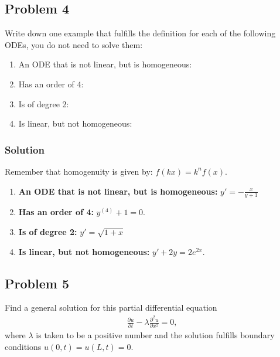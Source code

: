 \subsection*{Problem 4}
Write down one example that fulfills the definition for each of the following ODEs, you do not need to solve them:
\begin{enumerate}
    \item An ODE that is not linear, but is homogeneous:
    \item Has an order of 4:
    \item Is of degree 2:
    \item Is linear, but not homogeneous:
\end{enumerate}

\subsubsection*{Solution}
Remember that homogenuity is given by: $f(kx) = k^nf(x)$.
\begin{enumerate}
    \item \textbf{An ODE that is not linear, but is homogeneous:} $y' = -\frac{x}{y + 1}$
    \item \textbf{Has an order of 4:} $y^{(4)} + 1 = 0$.
    \item \textbf{Is of degree 2:} $y' = \sqrt{1 + x}$
    \item \textbf{Is linear, but not homogeneous:} $y' + 2y = 2e^{2x}$.
\end{enumerate}

\subsection*{Problem 5}
Find a general solution for this partial differential equation
\begin{align*}
    \frac{\partial u}{\partial t} - \lambda \frac{\partial^2u}{\partial x^2} = 0,
\end{align*}where $\lambda$ is taken to be a positive number and the solution fulfills boundary conditions $u(0, t) = u(L, t) = 0$.

